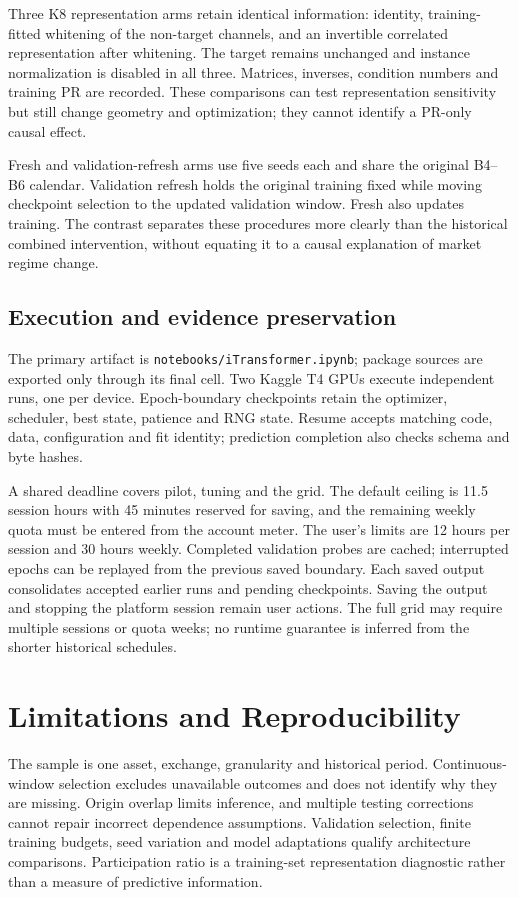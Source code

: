\documentclass[onecolumn,journal,a4paper,11pt]{IEEEtran}
\begin{document}
Three K8 representation arms retain identical information: identity,
training-fitted whitening of the non-target channels, and an invertible
correlated representation after whitening. The target remains unchanged and
instance normalization is disabled in all three. Matrices, inverses,
condition numbers and training PR are recorded. These comparisons can test
representation sensitivity but still change geometry and optimization;
they cannot identify a PR-only causal effect.

Fresh and validation-refresh arms use five seeds each and share the original
B4--B6 calendar. Validation refresh holds the original training fixed while
moving checkpoint selection to the updated validation window. Fresh also
updates training. The contrast separates these procedures more clearly than
the historical combined intervention, without equating it to a causal
explanation of market regime change.

\subsection{Execution and evidence preservation}
The primary artifact is \texttt{notebooks/iTransformer.ipynb}; package
sources are exported only through its final cell. Two Kaggle T4 GPUs execute
independent runs, one per device. Epoch-boundary checkpoints retain the
optimizer, scheduler, best state, patience and RNG state. Resume accepts
matching code, data, configuration and fit identity; prediction completion
also checks schema and byte hashes.

A shared deadline covers pilot, tuning and the grid. The default ceiling is
11.5 session hours with 45 minutes reserved for saving, and the remaining
weekly quota must be entered from the account meter. The user's limits are
12 hours per session and 30 hours weekly. Completed validation probes are
cached; interrupted epochs can be replayed from the previous saved boundary.
Each saved output consolidates accepted earlier runs and pending checkpoints.
Saving the output and stopping the platform session remain user actions.
The full grid may require multiple sessions or quota weeks; no runtime
guarantee is inferred from the shorter historical schedules.

\section{Limitations and Reproducibility}
The sample is one asset, exchange, granularity and historical period.
Continuous-window selection excludes unavailable outcomes and does not
identify why they are missing. Origin overlap limits inference, and multiple
testing corrections cannot repair incorrect dependence assumptions.
Validation selection, finite training budgets, seed variation and model
adaptations qualify architecture comparisons. Participation ratio is a
training-set representation diagnostic rather than a measure of predictive
information.
\end{document}
